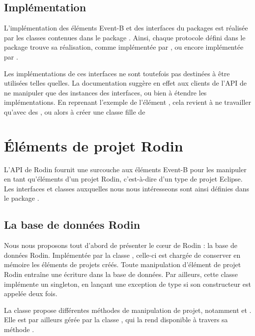 \subsection{Implémentation}

L'implémentation des éléments Event-B et des interfaces du packages  est réalisée par les classes contenues dans %
le package .
Ainsi, chaque protocole défini dans le package  trouve sa réalisation, comme  implémentée par %
, ou encore  implémentée par .

Les implémentations de ces interfaces ne sont toutefois pas destinées à être utilisées telles quelles.
La documentation suggère en effet aux clients de l'API de ne manipuler que des instances des interfaces, ou bien à étendre les implémentations.
En reprenant l'exemple de l'élément , cela revient à ne travailler qu'avec des , ou alors à créer une classe fille de 


\section{Éléments de projet Rodin}

L'API de Rodin fournit une surcouche aux éléments Event-B pour les manipuler en tant qu'éléments d'un projet Rodin, c'est-à-dire d'un type de projet Eclipse.
Les interfaces et classes auxquelles nous nous intéresseons sont ainsi définies dans le package .

\subsection{La base de données Rodin}

Nous nous proposons tout d'abord de présenter le cœur de Rodin : la base de données Rodin.
Implémentée par la classe , celle-ci est chargée de conserver en mémoire les éléments de projets créés.
Toute manipulation d'élément de projet Rodin entraîne une écriture dans la base de données.
Par ailleurs, cette classe implémente un singleton, en lançant une exception de type  si son constructeur est appelée deux fois.

La classe  propose différentes méthodes de manipulation de projet, notamment  et .
Elle est par ailleurs gérée par la classe , qui la rend disponible à travers sa méthode .


